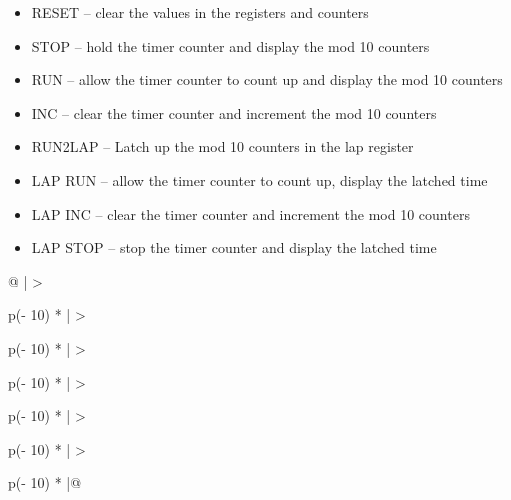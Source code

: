 \begin{Figure}
\begin{itemize}
\item
  RESET -- clear the values in the registers and counters
\item
  STOP -- hold the timer counter and display the mod 10 counters
\item
  RUN -- allow the timer counter to count up and display the mod 10
  counters
\item
  INC -- clear the timer counter and increment the mod 10 counters
\item
  RUN2LAP -- Latch up the mod 10 counters in the lap register
\item
  LAP RUN -- allow the timer counter to count up, display the latched
  time
\item
  LAP INC -- clear the timer counter and increment the mod 10 counters
\item
  LAP STOP -- stop the timer counter and display the latched time
\end{itemize}

\begin{longtable}[]{@{}
| >{\raggedright\arraybackslash}p{(\columnwidth - 10\tabcolsep) * }|
  >{\raggedright\arraybackslash}p{(\columnwidth - 10\tabcolsep) * }|
  >{\raggedright\arraybackslash}p{(\columnwidth - 10\tabcolsep) * }|
  >{\raggedright\arraybackslash}p{(\columnwidth - 10\tabcolsep) * }|
  >{\raggedright\arraybackslash}p{(\columnwidth - 10\tabcolsep) * }|
  >{\raggedright\arraybackslash}p{(\columnwidth - 10\tabcolsep) * }|@{}}
\caption{Control word table for the datapath shown in Figure~}
\end{longtable}
\end{Figure}
